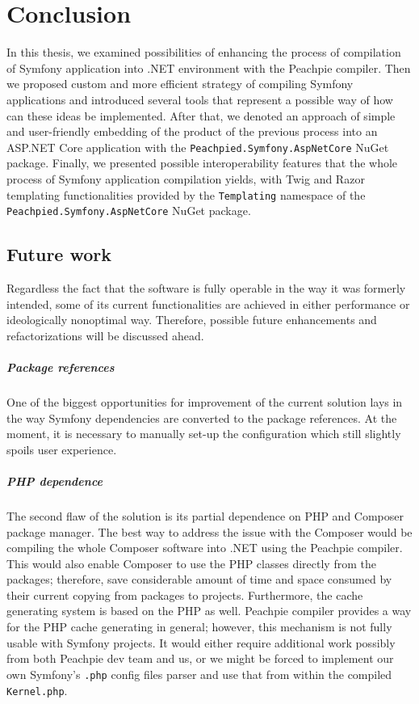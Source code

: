 \chapter*{Conclusion}
In this thesis, we examined possibilities of enhancing the process of compilation of Symfony application into .NET environment with the Peachpie compiler. Then we proposed custom and more efficient strategy of compiling Symfony applications and introduced several tools that represent a possible way of how can these ideas be implemented. After that, we denoted an approach of simple and user-friendly embedding of the product of the previous process into an ASP.NET Core application with the \texttt{Peachpied.Symfony.AspNetCore} NuGet package. Finally, we presented possible interoperability features that the whole process of Symfony application compilation yields, with Twig and Razor templating functionalities provided by the \texttt{Templating} namespace of the \texttt{Peachpied.Symfony.AspNetCore} NuGet package.


\section*{Future work}
Regardless the fact that the software is fully operable in the way it was formerly intended, some of its current functionalities are achieved in either performance or ideologically nonoptimal way. Therefore, possible future enhancements and refactorizations will be discussed ahead.

\paragraph{Package references} One of the biggest opportunities for improvement of the current solution lays in the way Symfony dependencies are converted to the package references. At the moment, it is necessary to manually set-up the configuration which still slightly spoils user experience.

\paragraph{PHP dependence} The second flaw of the solution is its partial dependence on PHP and Composer package manager. The best way to address the issue with the Composer would be compiling the whole Composer software into .NET using the Peachpie compiler. This would also enable Composer to use the PHP classes directly from the packages; therefore, save considerable amount of time and space consumed by their current copying from packages to projects. Furthermore, the cache generating system is based on the PHP as well. Peachpie compiler provides a way for the PHP cache generating in general; however, this mechanism is not fully usable with Symfony projects. It would either require additional work possibly from both Peachpie dev team and us, or we might be forced to implement our own Symfony's \texttt{.php} config files parser and use that from within the compiled \texttt{Kernel.php}.

